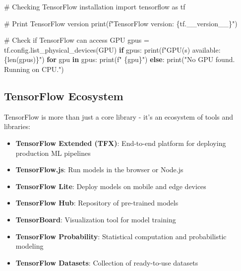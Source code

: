 \documentclass[
  letterpaper,
  DIV=11,
  numbers=noendperiod]{scrreprt}
\newenvironment{Shaded}{\begin{snugshade}}{\end{snugshade}}
\newcommand{\BuiltInTok}[1]{\textcolor[rgb]{0.00,0.23,0.31}{#1}}
\newcommand{\CommentTok}[1]{\textcolor[rgb]{0.37,0.37,0.37}{#1}}
\newcommand{\ControlFlowTok}[1]{\textcolor[rgb]{0.00,0.23,0.31}{\textbf{#1}}}
\newcommand{\ImportTok}[1]{\textcolor[rgb]{0.00,0.46,0.62}{#1}}
\newcommand{\KeywordTok}[1]{\textcolor[rgb]{0.00,0.23,0.31}{\textbf{#1}}}
\newcommand{\NormalTok}[1]{\textcolor[rgb]{0.00,0.23,0.31}{#1}}
\newcommand{\OperatorTok}[1]{\textcolor[rgb]{0.37,0.37,0.37}{#1}}
\newcommand{\SpecialCharTok}[1]{\textcolor[rgb]{0.37,0.37,0.37}{#1}}
\newcommand{\SpecialStringTok}[1]{\textcolor[rgb]{0.13,0.47,0.30}{#1}}
\newcommand{\StringTok}[1]{\textcolor[rgb]{0.13,0.47,0.30}{#1}}
\providecommand{\tightlist}{%
  \setlength{\itemsep}{0pt}\setlength{\parskip}{0pt}}\usepackage{longtable,booktabs,array}
\begin{document}
\begin{Shaded}
\begin{Highlighting}[]
\CommentTok{\# Checking TensorFlow installation}
\ImportTok{import}\NormalTok{ tensorflow }\ImportTok{as}\NormalTok{ tf}

\CommentTok{\# Print TensorFlow version}
\BuiltInTok{print}\NormalTok{(}\SpecialStringTok{f"TensorFlow version: }\SpecialCharTok{\{}\NormalTok{tf}\SpecialCharTok{.}\NormalTok{\_\_version\_\_}\SpecialCharTok{\}}\SpecialStringTok{"}\NormalTok{)}

\CommentTok{\# Check if TensorFlow can access GPU}
\NormalTok{gpus }\OperatorTok{=}\NormalTok{ tf.config.list\_physical\_devices(}\StringTok{\textquotesingle{}GPU\textquotesingle{}}\NormalTok{)}
\ControlFlowTok{if}\NormalTok{ gpus:}
    \BuiltInTok{print}\NormalTok{(}\SpecialStringTok{f"GPU(s) available: }\SpecialCharTok{\{}\BuiltInTok{len}\NormalTok{(gpus)}\SpecialCharTok{\}}\SpecialStringTok{"}\NormalTok{)}
    \ControlFlowTok{for}\NormalTok{ gpu }\KeywordTok{in}\NormalTok{ gpus:}
        \BuiltInTok{print}\NormalTok{(}\SpecialStringTok{f"  }\SpecialCharTok{\{}\NormalTok{gpu}\SpecialCharTok{\}}\SpecialStringTok{"}\NormalTok{)}
\ControlFlowTok{else}\NormalTok{:}
    \BuiltInTok{print}\NormalTok{(}\StringTok{"No GPU found. Running on CPU."}\NormalTok{)}
\end{Highlighting}
\end{Shaded}

\subsection{TensorFlow Ecosystem}\label{tensorflow-ecosystem}

TensorFlow is more than just a core library - it's an ecosystem of tools
and libraries:

\begin{itemize}
\tightlist
\item
  \textbf{TensorFlow Extended (TFX)}: End-to-end platform for deploying
  production ML pipelines
\item
  \textbf{TensorFlow.js}: Run models in the browser or Node.js
\item
  \textbf{TensorFlow Lite}: Deploy models on mobile and edge devices
\item
  \textbf{TensorFlow Hub}: Repository of pre-trained models
\item
  \textbf{TensorBoard}: Visualization tool for model training
\item
  \textbf{TensorFlow Probability}: Statistical computation and
  probabilistic modeling
\item
  \textbf{TensorFlow Datasets}: Collection of ready-to-use datasets
\end{itemize}
\end{document}
